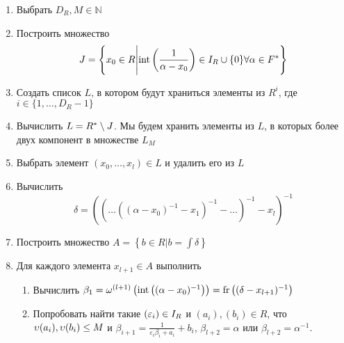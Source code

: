 \documentclass[_00_autoref.tex]{subfiles}
\begin{document}
    \begin{enumerate}
        \item Выбрать $D_R, M \in \mathbb{N}$
        
        \item Построить множество
        \begin{equation*}
            J = \left\{
                x_0 \in R \Bigg| \textrm{int}\left(\frac{1}{\alpha-x_0}\right) \in I_{R} \cup \{0\} \forall \alpha \in F^{*}
            \right\}
        \end{equation*}
        
        \item Создать список $L$, в котором будут храниться элементы из $R^i$, где $i \in \{1, \ldots, D_R - 1\}$

        \item Вычислить $L = R^{*} \setminus J$.
        Мы будем хранить элементы из $L$, в которых более двух компонент в множестве $L_M$

        \item\label{step:every_element_in_L} Выбрать элемент $(x_0, \ldots, x_l) \in L$ и удалить его из $L$

        \item Вычислить
        \begin{equation*}
            \delta = \left(
                \left(
                    \ldots\left(
                        \left(
                            \alpha - x_0
                        \right)^{-1} - x_1
                    \right)^{-1} - \ldots
                \right)^{-1} - x_l
            \right)^{-1}
        \end{equation*}

        \item Построить множество $A = \left\{b \in R \big| b = \int{\delta}\right\}$

        \item\label{step:every_element_in_A} Для каждого элемента $x_{l+1} \in A$ выполнить
        \begin{enumerate}
            \item Вычислить $\beta_1 = \omega^{(l+1)}\left(\textrm{int}\left((\alpha-x_0)^{-1}\right)\right) = \textrm{fr}\left((\delta-x_{l+1})^{-1}\right)$

            \item Попробовать найти такие $(\varepsilon_i) \in I_{R}$ и $(a_i), (b_i) \in R$, что $\upsilon(a_i),\upsilon(b_i) \le M$ и $\beta_{i+1}=\frac{1}{\varepsilon_i \beta_i + a_i} + b_i$, $\beta_{l+2}=\alpha \textrm{ или } \beta_{l+2}=\alpha^{-1}$.


\end{enumerate}
\end{enumerate}
\end{document}

